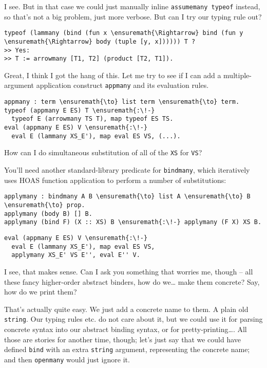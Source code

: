 \heroSTUDENT{} I see. But in that case we could just manually inline
\texttt{assumemany\ typeof} instead, so that's not a big problem, just
more verbose. But can I try our typing rule out?

\begin{verbatim}
typeof (lammany (bind (fun x \ensuremath{\Rightarrow} bind (fun y \ensuremath{\Rightarrow} body (tuple [y, x]))))) T ?
>> Yes:
>> T := arrowmany [T1, T2] (product [T2, T1]).
\end{verbatim}

\noindent
Great, I think I got the hang of this. Let me try to see if I can add a
multiple-argument application construct \texttt{appmany} and its
evaluation rules.

\begin{verbatim}
appmany : term \ensuremath{\to} list term \ensuremath{\to} term.
typeof (appmany E ES) T \ensuremath{:\!-}
  typeof E (arrowmany TS T), map typeof ES TS.
eval (appmany E ES) V \ensuremath{:\!-}
  eval E (lammany XS_E'), map eval ES VS, (...).
\end{verbatim}

\noindent
How can I do simultaneous substitution of all of the \texttt{XS} for
\texttt{VS}?

\heroADVISOR{} You'll need another standard-library predicate for
\texttt{bindmany}, which iteratively uses HOAS function application to
perform a number of substitutions:

\begin{verbatim}
applymany : bindmany A B \ensuremath{\to} list A \ensuremath{\to} B \ensuremath{\to} prop.
applymany (body B) [] B.
applymany (bind F) (X :: XS) B \ensuremath{:\!-} applymany (F X) XS B.
\end{verbatim}

\begin{verbatim}
eval (appmany E ES) V \ensuremath{:\!-}
  eval E (lammany XS_E'), map eval ES VS,
  applymany XS_E' VS E'', eval E'' V.
\end{verbatim}

\heroSTUDENT{} I see, that makes sense. Can I ask you something that worries
me, though -- all these fancy higher-order abstract binders, how do
we\ldots{} make them concrete? Say, how do we print them?

\heroADVISOR{} That's actually quite easy. We just add a concrete name to
them. A plain old \texttt{string}. Our typing rules etc. do not care
about it, but we could use it for parsing concrete syntax into our
abstract binding syntax, or for pretty-printing\ldots{}. All those are
stories for another time, though; let's just say that we could have
defined \texttt{bind} with an extra \texttt{string} argument,
representing the concrete name; and then \texttt{openmany} would just
ignore it.

